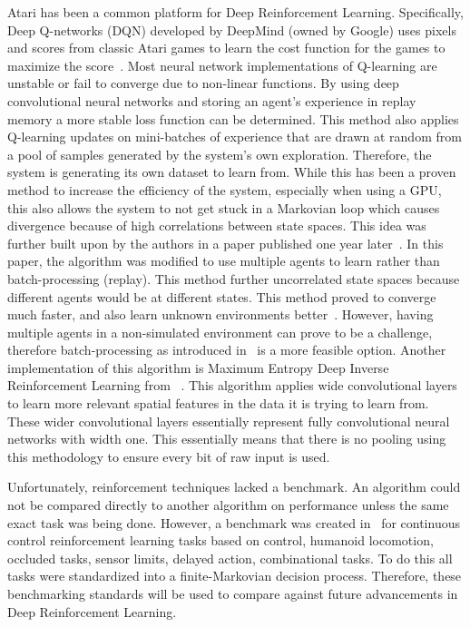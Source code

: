 \documentclass[12pt,american]{report}
\begin{document}
	Atari has been a common platform for Deep Reinforcement Learning. Specifically, Deep Q-networks (DQN) developed by DeepMind (owned by Google) uses pixels and scores from classic Atari games to learn the cost function for the games to maximize the score~\cite{mnih2015human}. Most neural network implementations of Q-learning are unstable or fail to converge due to non-linear functions. By using deep convolutional neural networks and storing an agent's experience in replay memory a more stable loss function can be determined.   This method also applies Q-learning updates on mini-batches of experience that are drawn at random from a pool of samples generated by the system's own exploration. Therefore, the system is generating its own dataset to learn from. While this has been a proven method to increase the efficiency of the system, especially when using a GPU, this also allows the system to not get stuck in a Markovian loop which causes divergence because of high correlations between state spaces.  This idea was further built upon by the authors in a paper published one year later~\cite{mnih2016asynchronous}. In this paper, the algorithm was modified to use multiple agents to learn rather than batch-processing (replay). This method further uncorrelated state spaces because different agents would be at different states. This method proved to converge much faster, and also learn unknown environments better~\cite{mnih2016asynchronous}. However, having multiple agents in a non-simulated environment can prove to be a challenge, therefore batch-processing as introduced in~\cite{mnih2015human} is a more feasible option. Another implementation of this algorithm is Maximum Entropy Deep Inverse Reinforcement Learning from ~\cite{wulfmeier2015maximum}. This algorithm applies wide convolutional layers to learn more relevant spatial features in the data it is trying to learn from. These wider convolutional layers essentially represent fully convolutional neural networks with width one. This essentially means that there is no pooling using this methodology to ensure every bit of raw input is used. 

	Unfortunately, reinforcement techniques lacked a benchmark.  An algorithm could not be compared directly to another algorithm on performance unless the same exact task was being done.  However, a benchmark was created in~\cite{duan2016benchmarking} for continuous control reinforcement learning tasks based on control, humanoid locomotion, occluded tasks, sensor limits, delayed action, combinational tasks. To do this all tasks were standardized into a finite-Markovian decision process. Therefore, these benchmarking standards will be used to compare against future advancements in Deep Reinforcement Learning. 
\end{document}
